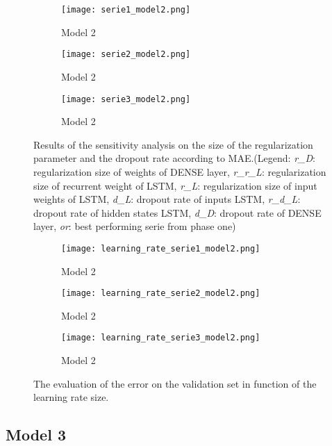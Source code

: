 \begin{figure}[h]
	\centering
	\begin{subfigure}{0.49\linewidth}
		\texttt{[image: serie1\_model2.png]}
		\caption{Model 2}
	\end{subfigure}	
	\begin{subfigure}{0.49\linewidth}
		\texttt{[image: serie2\_model2.png]}
		\caption{Model 2}
	\end{subfigure}
	\begin{subfigure}{0.5\linewidth}
		\texttt{[image: serie3\_model2.png]}
		\caption{Model 2}
	\end{subfigure}
	\caption{Results of the sensitivity analysis on the size of the regularization parameter and the dropout rate according to MAE.(Legend: \textit{r\_D}: regularization size of weights of DENSE layer,  \textit{r\_r\_L}: regularization size of recurrent weight of LSTM, \textit{r\_L}: regularization size of input weights of LSTM, \textit{d\_L}: dropout rate of inputs LSTM, \textit{r\_d\_L}: dropout rate of hidden states LSTM, \textit{d\_D}: dropout rate of DENSE layer, \textit{or}: best performing serie from phase one)}
	\label{fig:sensitivity_model2}
\end{figure}

\begin{figure}[h]
	\centering
	\begin{subfigure}{0.49\linewidth}
		\texttt{[image: learning\_rate\_serie1\_model2.png]}
		\caption{Model 2}
	\end{subfigure}	
	\begin{subfigure}{0.49\linewidth}
		\texttt{[image: learning\_rate\_serie2\_model2.png]}
		\caption{Model 2}
	\end{subfigure}
	\begin{subfigure}{0.5\linewidth}
		\texttt{[image: learning\_rate\_serie3\_model2.png]}
		\caption{Model 2}
	\end{subfigure}
	\caption{The evaluation of the error on the validation set in function of the learning rate size.}
	\label{fig:learning_rate_model2}
\end{figure}

\clearpage
\subsection{Model 3}


